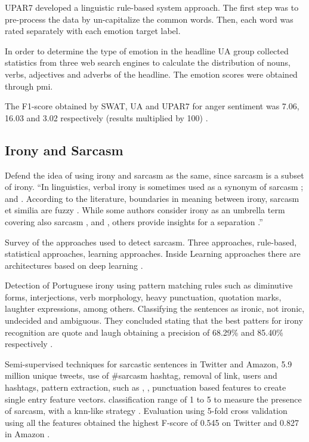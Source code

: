 UPAR7 developed a linguistic rule-based system approach. The first step was to pre-process the data by un-capitalize the common words. Then, each word was rated separately with each emotion target label. 

In order to determine the type of emotion in the headline UA group collected statistics from three web search engines to calculate the distribution of nouns, verbs, adjectives and adverbs of the headline. The emotion scores were obtained through \acrfull{pmi}.

The F1-score obtained by SWAT, UA and UPAR7 for anger sentiment was 7.06, 16.03 and 3.02 respectively (results multiplied by 100) \cite{strapparava2007semeval}.

\subsection{Irony and Sarcasm}
\label{subsec:irony_sarcasm}

Defend the idea of using irony and sarcasm as the same, since sarcasm is a subset of irony.
``In linguistics, verbal irony is sometimes used as a synonym of sarcasm \cite{giora2013negation}; \cite{giora2015defaultness} and \cite{giora2015default}. According to the literature, boundaries in meaning between irony, sarcasm et similia are fuzzy \cite{bosco2013developing}. While some authors consider irony as an umbrella term covering also sarcasm \cite{gibbs1991psychological}, \cite{wilson2006pragmatics} and \cite{kreuz1993empirical}, others provide insights for a separation \cite{filatova2012irony}.''


Survey of the approaches used to detect sarcasm. Three approaches, rule-based, statistical approaches, learning approaches. Inside Learning approaches there are architectures based on deep learning \cite{joshi2016automatic}.

Detection of Portuguese irony using pattern matching rules such as diminutive forms, interjections, verb morphology, heavy punctuation, quotation marks, laughter expressions, among others. Classifying the sentences as ironic, not ironic, undecided and ambiguous. They concluded stating that the best patters for irony recognition are quote and laugh obtaining a precision of 68.29\% and 85.40\% respectively \cite{carvalho2009clues}.

Semi-supervised techniques for sarcastic sentences in Twitter and Amazon, 5.9 million unique tweets, use of \#sarcasm hashtag, removal of link, users and hashtags, pattern extraction, such as , , punctuation based features to create single entry feature vectors. classification range of 1 to 5 to measure the presence of sarcasm, with a \acrfull{knn}-like strategy \cite{davidov2010enhanced}. Evaluation using 5-fold cross validation using all the features obtained the highest F-score of 0.545 on Twitter and 0.827 in Amazon \cite{davidov2010semi}.